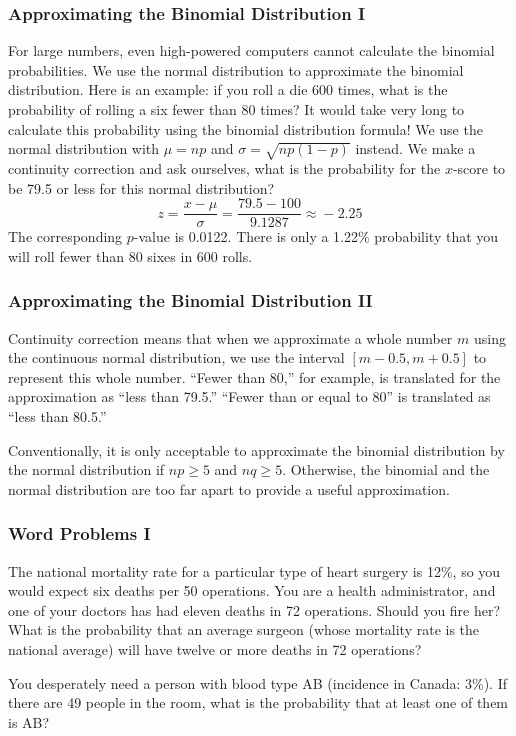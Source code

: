 \documentclass[xcolor=dvipsnames]{beamer}
\begin{document}
\begin{frame}
  \frametitle{Approximating the Binomial Distribution I}
For large numbers, even high-powered computers cannot calculate the
binomial probabilities. We use the normal distribution to approximate
the binomial distribution. Here is an example: if you roll a die 600
times, what is the probability of rolling a six fewer than 80 times? It
would take very long to calculate this probability using the binomial
distribution formula! We use the normal distribution with $\mu=np$ and
$\sigma=\sqrt{np(1-p)}$ instead. We make a \alert{continuity
  correction} and ask ourselves, what is the probability for the
$x$-score to be 79.5 or less for this normal distribution?
\begin{equation}
  \label{eq:oolojuth}
  z=\frac{x-\mu}{\sigma}=\frac{79.5-100}{9.1287}\approx{}-2.25
\end{equation}
The corresponding $p$-value is 0.0122. There is only a 1.22\%
probability that you will roll fewer than 80 sixes in 600 rolls.
\end{frame}

\begin{frame}
  \frametitle{Approximating the Binomial Distribution II}
Continuity correction means that when we approximate a whole number $m$
using the continuous normal distribution, we use the interval
$[m-0.5,m+0.5]$ to represent this whole number. ``Fewer than 80,'' for
example, is translated for the approximation as ``less than 79.5.''
``Fewer than or equal to 80'' is translated as ``less than 80.5.''

Conventionally, it is only acceptable to approximate the binomial
distribution by the normal distribution if $np\geq{}5$ and
$nq\geq{}5$. Otherwise, the binomial and the normal distribution are
too far apart to provide a useful approximation.
\end{frame}

\begin{frame}
  \frametitle{Word Problems I}
The national mortality rate for a particular type of heart surgery
is 12\%, so you would expect six deaths per 50 operations. You are a
health administrator, and one of your doctors has had eleven deaths in
72 operations. Should you fire her? What is the probability that an
average surgeon (whose mortality rate is the national average) will
have twelve or more deaths in 72 operations?

\bigskip

You desperately need a person with blood type AB (incidence in
Canada: 3\%). If there are 49 people in the room, what is the
probability that at least one of them is AB?
\end{frame}
\end{document}
